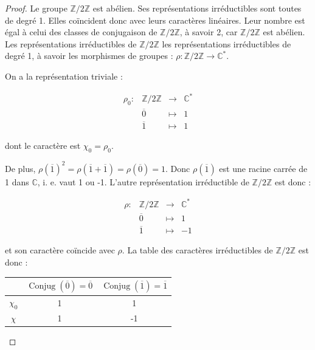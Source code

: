 \documentclass[french]{book}
\theoremstyle{definition}
\begin{document}
\begin{proof}
  Le groupe \(\mathbb{Z}/{ 2 }\mathbb{Z}\) est abélien. Ses représentations irréductibles sont toutes de degré 1. Elles co\"incident donc avec leurs caractères linéaires. Leur nombre est égal à celui des classes de conjugaison de \(\mathbb{Z}/{ 2 }\mathbb{Z}\), à savoir 2, car \(\mathbb{Z}/{2}\mathbb{Z}\) est abélien. Les représentations irréductibles de \(\mathbb{Z}/{ 2 }\mathbb{Z}\) les représentations irréductibles de degré 1, à savoir les morphismes de groupes : \(\rho : \mathbb{Z}/{ 2 }\mathbb{Z} \longrightarrow \mathbb{C} ^{*}\).

  On a la représentation triviale :

  \[\begin{matrix}
  \rho_0 : & \mathbb{Z}/{ 2 }\mathbb{Z} & \longrightarrow & \mathbb{C} ^{*} \\
  \ & \overline{0}  & \longmapsto & 1 \\
  \ & \overline{1}  & \longmapsto & 1
  \end{matrix}\]

  dont le caractère est \(\chi_0 = \rho_0\).

  De plus, \(\rho(\overline{1})^2 = \rho(\overline{1}+ \overline{1}) = \rho(\overline{0}) = 1\). Donc \(\rho(\overline{1})\) est une racine carrée de 1 dans \(\mathbb{C}\), i. e. vaut 1 ou -1. L'autre représentation irréductible de \(\mathbb{Z}/{ 2 }\mathbb{Z}\) est donc :

  \[\begin{matrix}
  \rho : & \mathbb{Z}/{ 2 }\mathbb{Z} & \longrightarrow & \mathbb{C} ^{*} \\
  \ & \overline{0}  & \longmapsto & 1 \\
  \ & \overline{1}  & \longmapsto & -1
  \end{matrix}\]

  et son caractère co\"incide avec \(\rho\). La table des caractères irréductibles de \(\mathbb{Z}/{ 2 }\mathbb{Z}\) est donc :

  \begin{center}
    \begin{tabular}{|c|c|c|}
      \hline
      \ & $ \operatorname{Conjug}(\overline{0}) = \overline{0} $ & $ \operatorname{Conjug}(\overline{1}) = \overline{1}$ \\
      \hline
      $\chi_0$ & 1 & 1 \\
      \hline
      $\chi$ & 1 & -1 \\
      \hline
    \end{tabular}
  \end{center}


\end{proof}
\end{document}
